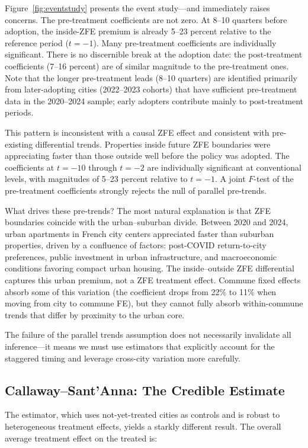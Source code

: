 \documentclass[12pt]{article}
\begin{document}
Figure~\ref{fig:eventstudy} presents the event study---and immediately raises concerns. The pre-treatment coefficients are not zero. At 8--10 quarters before adoption, the inside-ZFE premium is already 5--23 percent relative to the reference period ($t = -1$). Many pre-treatment coefficients are individually significant. There is no discernible break at the adoption date: the post-treatment coefficients (7--16 percent) are of similar magnitude to the pre-treatment ones. Note that the longer pre-treatment leads (8--10 quarters) are identified primarily from later-adopting cities (2022--2023 cohorts) that have sufficient pre-treatment data in the 2020--2024 sample; early adopters contribute mainly to post-treatment periods.

This pattern is inconsistent with a causal ZFE effect and consistent with pre-existing differential trends. Properties inside future ZFE boundaries were appreciating faster than those outside well before the policy was adopted. The coefficients at $t = -10$ through $t = -2$ are individually significant at conventional levels, with magnitudes of 5--23 percent relative to $t = -1$. A joint $F$-test of the pre-treatment coefficients strongly rejects the null of parallel pre-trends.

What drives these pre-trends? The most natural explanation is that ZFE boundaries coincide with the urban--suburban divide. Between 2020 and 2024, urban apartments in French city centers appreciated faster than suburban properties, driven by a confluence of factors: post-COVID return-to-city preferences, public investment in urban infrastructure, and macroeconomic conditions favoring compact urban housing. The inside--outside ZFE differential captures this urban premium, not a ZFE treatment effect. Commune fixed effects absorb some of this variation (the coefficient drops from 22\% to 11\% when moving from city to commune FE), but they cannot fully absorb within-commune trends that differ by proximity to the urban core.

The failure of the parallel trends assumption does not necessarily invalidate all inference---it means we must use estimators that explicitly account for the staggered timing and leverage cross-city variation more carefully.

\subsection{Callaway--Sant'Anna: The Credible Estimate}

The \citet{callaway2021difference} estimator, which uses not-yet-treated cities as controls and is robust to heterogeneous treatment effects, yields a starkly different result. The overall average treatment effect on the treated is:
\end{document}
